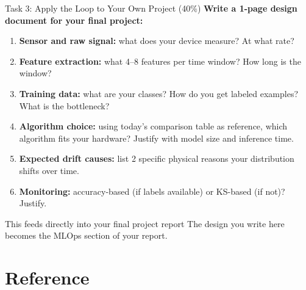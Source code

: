 \documentclass[aspectratio=169,11pt]{beamer}
\begin{document}
\begin{frame}{Task 3: Apply the Loop to Your Own Project (40\%)}
    \textbf{Write a 1-page design document for your final project:}
    \begin{enumerate}
        \item \textbf{Sensor and raw signal:} what does your device measure? At what rate?
        \item \textbf{Feature extraction:} what 4--8 features per time window? How long is the window?
        \item \textbf{Training data:} what are your classes? How do you get labeled examples? What is the bottleneck?
        \item \textbf{Algorithm choice:} using today's comparison table as reference, which algorithm fits your hardware? Justify with model size and inference time.
        \item \textbf{Expected drift causes:} list 2 specific physical reasons your distribution shifts over time.
        \item \textbf{Monitoring:} accuracy-based (if labels available) or KS-based (if not)? Justify.
    \end{enumerate}

    \begin{alertblock}{This feeds directly into your final project report}
        The design you write here becomes the MLOps section of your report.
    \end{alertblock}
\end{frame}

\section{Reference}
\end{document}
